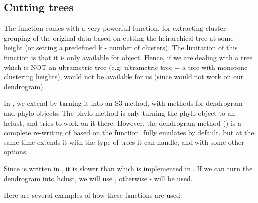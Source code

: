 \documentclass[shortnames,nojss,article]{jss}\usepackage{graphicx, color}
\begin{document}
\subsection{Cutting trees}

The  function comes with a very powerfull  function, for extracting cluster grouping of the original data based on cutting the heirarchical tree at some height (or setting a predefined k - number of clusters). The limitation of this function is that it is only available for  object. Hence, if we are dealing with a tree which is NOT an ultrametric tree (e.g: ultrametric tree = a tree with monotone clustering heights),  would not be available for us (since  would not work on our dendrogram).

In , we extend  by turning it into an S3 method, with methods for dendrogram and phylo objects. The phylo method is only turning the phylo object to an hclust, and tries to work on it there. However, the dendrogram method () is a complete re-writing of  based on the  function.  fully emulates  by default, but at the same time extends it with the type of trees it can handle, and with some other options.

Since  is written in , it is slower than  which is implemented in . If we can turn the dendrogram into hclust, we will use , otherwise -  will be used.

Here are several examples of how these functions are used:
\end{document}
